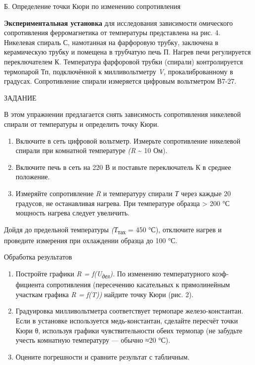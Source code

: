 \documentclass[]{article}
\begin{document}
Б. Определение точки Кюри по изменению сопротивления

\textbf{Экспериментальная установка} для исследования зависимости
омического сопротивления ферромагнетика от температуры представ­лена на
рис. 4. Никелевая спираль С, намотанная на фарфоровую труб­ку, заключена
в керамическую трубку и помещена в трубчатую печь П. Нагрев печи
регулируется переключателем К. Температура фарфоро­вой трубки (спирали)
контролируется термопарой Тп, подключённой к милливольтметру \emph{V,}
прокалиброванному в градусах. Сопротивление спирали измеряется цифровым
вольтметром В7-27.

ЗАДАНИЕ

В этом упражнении предлагается снять зависимость сопротивления никелевой
спирали от температуры и определить точку Кюри.

\begin{enumerate}
\def\labelenumi{\arabic{enumi}.}
\item
  Включите в сеть цифровой вольтметр. Измерьте сопротивление ни­келевой
  спирали при комнатной температуре \emph{(R} \textasciitilde{} 10 Ом).
\item
  Включите печь в сеть на 220 В и поставьте переключатель К в среднее
  положение.
\item
  Измеряйте сопротивление \emph{R} и температуру спирали \emph{Т} через
  каж­дые 20 градусов, не останавливая нагрева. При температуре образца
  \textgreater{} 200 °С мощность нагрева следует увеличить.
\end{enumerate}

Дойдя до предельной температуры \emph{(Т}\textsubscript{тах} = 450 °С),
отключите на­грев и проведите измерения при охлаждении образца до 100
°С.

Обработка результатов

\begin{enumerate}
\def\labelenumi{\arabic{enumi}.}
\item
  Постройте графики \emph{R = f(U\textsubscript{дел}).} По изменению
  температурного коэф­фициента сопротивления (пересечению касательных к
  прямолинейным участкам графика \emph{R = f(T))} найдите точку Кюри
  (рис. 2).
\item
  Градуировка милливольтметра соответствует термопаре железо-константан.
  Если в установке используется медь-константан, сделайте пе­ресчёт
  точки Кюри θ, используя графики чувствительности обеих тер­мопар (не
  забудьте учесть комнатную температуру --- обычно ≈20 °С).
\item
  Оцените погрешности и сравните результат с табличным.
\end{enumerate}
\end{document}
